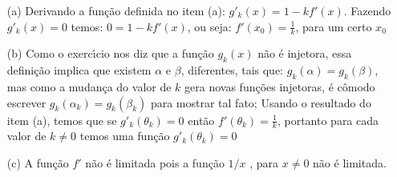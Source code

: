 \begin{enumerate}

\item[(a)] Derivando a fun\c c\~ao definida no item (a): $g'_k(x)=1-kf'(x)$. Fazendo $g'_k(x)=0$ temos: $0=1-kf'(x)$, ou seja: $f'(x_0)=\frac1{k}$, para um certo $x_0$

\item[(b)] Como o exerc\'\i cio nos diz que a fun\c c\~ao $g_k(x)$ n\~ao \'e injetora, essa defini\c c\~ao implica que existem $\alpha$ e $\beta$, diferentes, tais que: $g_k(\alpha)=g_k(\beta)$, mas como a mudan\c ca do valor de $k$ gera novas fun\c c\~oes injetoras, \'e cômodo escrever $g_k(\alpha_k)=g_k(\beta_k)$ para mostrar tal fato; Usando o resultado do item (a), temos que se $g'_k(\theta_k)=0$ ent\~ao $f'(\theta_k)=\frac1{k}$, portanto para cada valor de $k\neq 0$ temos uma fun\c c\~ao $g'_k(\theta_k)=0$

\item[(c)] A fun\c c\~ao $f'$ n\~ao \'e limitada pois a fun\c c\~ao $1/x$ , para $x \neq 0$ n\~ao \'e limitada.

\end{enumerate}

